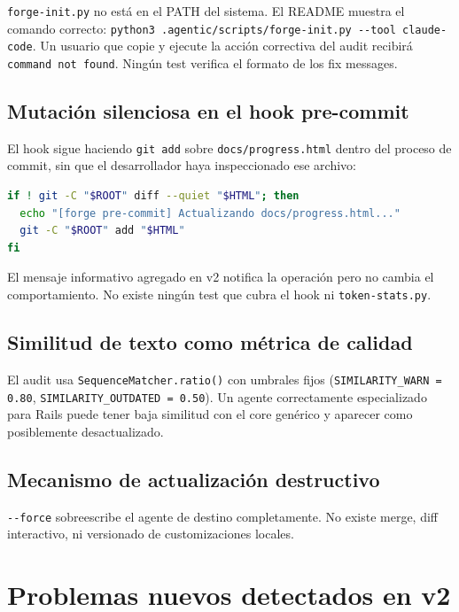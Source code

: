 \documentclass[12pt,a4paper]{article}
\begin{document}
\texttt{forge-init.py} no est\'a en el PATH del sistema. El README muestra el
comando correcto: \texttt{python3 .agentic/scripts/forge-init.py -{}-tool
claude-code}. Un usuario que copie y ejecute la acci\'on correctiva del audit
recibir\'a \texttt{command not found}. Ning\'un test verifica el formato de los
fix messages.

\subsection{Mutaci\'on silenciosa en el hook pre-commit}

El hook sigue haciendo \texttt{git add} sobre \texttt{docs/progress.html} dentro
del proceso de commit, sin que el desarrollador haya inspeccionado ese archivo:

\begin{lstlisting}[language=bash, caption={hooks/pre-commit: mutaci\'on activa}]
if ! git -C "$ROOT" diff --quiet "$HTML"; then
  echo "[forge pre-commit] Actualizando docs/progress.html..."
  git -C "$ROOT" add "$HTML"
fi
\end{lstlisting}

El mensaje informativo agregado en v2 notifica la operaci\'on pero no cambia el
comportamiento. No existe ning\'un test que cubra el hook ni \texttt{token-stats.py}.

\subsection{Similitud de texto como m\'etrica de calidad}

El audit usa \texttt{SequenceMatcher.ratio()} con umbrales fijos
(\texttt{SIMILARITY\_WARN = 0.80}, \texttt{SIMILARITY\_OUTDATED = 0.50}).
Un agente correctamente especializado para Rails puede tener baja similitud con el
core gen\'erico y aparecer como posiblemente desactualizado.

\subsection{Mecanismo de actualizaci\'on destructivo}

\texttt{-{}-force} sobreescribe el agente de destino completamente. No existe
merge, diff interactivo, ni versionado de customizaciones locales.

\section{Problemas nuevos detectados en v2}
\end{document}
